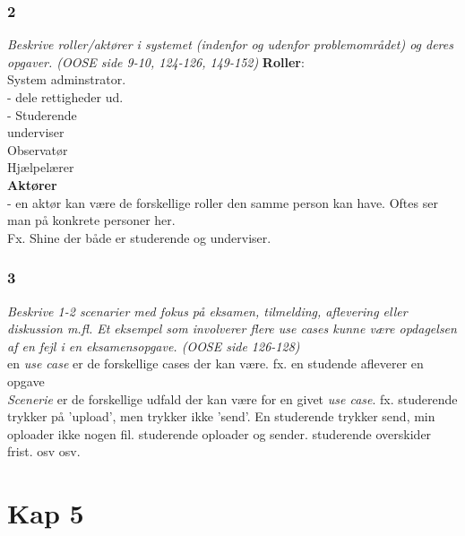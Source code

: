 \documentclass[12pt]{article}
\begin{document}
\subsubsection*{2}
\textit{Beskrive roller/aktører i systemet (indenfor og udenfor problemområdet) og deres opgaver.
(OOSE side 9-10, 124-126, 149-152)}
\textbf{Roller}:\\
System adminstrator.\\
- dele rettigheder ud.\\
- 
Studerende\\
underviser\\
Observatør\\
Hjælpelærer\\

\textbf{Aktører}\\
- en aktør kan være de forskellige roller den samme person kan have. Oftes ser man på konkrete personer her.\\
Fx. Shine der både er studerende og underviser.
\subsubsection*{3}
\textit{Beskrive 1-2 scenarier med fokus på eksamen, tilmelding, aflevering eller diskussion
m.fl. Et eksempel som involverer flere use cases kunne være opdagelsen af en fejl i en
eksamensopgave. (OOSE side 126-128)}\\
en \textit{use case} er de forskellige cases der kan være. fx. en studende afleverer en opgave\\
\textit{Scenerie} er de forskellige udfald der kan være for en givet \textit{use case}. fx. studerende trykker på 'upload', men trykker ikke 'send'. En studerende trykker send, min oploader ikke nogen fil. studerende oploader og sender. studerende overskider frist. osv osv. 
\section*{Kap 5}
\end{document}
